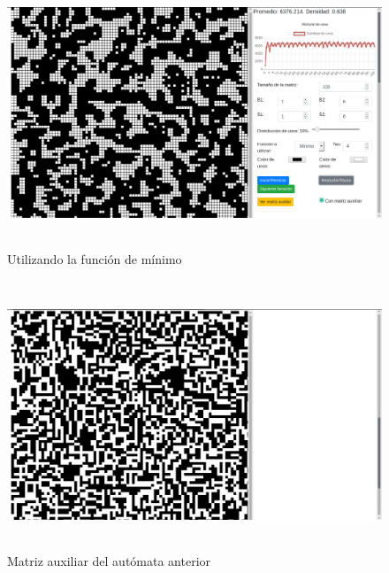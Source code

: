 \documentclass[12pt, titlepage]{article}
\begin{document}
\begin{figure}[H]
\begin{center}
 \includegraphics[width=15cm, height=8cm]{./img/1616-min.png}
 \caption{Utilizando la función de mínimo}
 \label{fig:1616-min}
\end{center}
\end{figure}

\begin{figure}[H]
\begin{center}
 \includegraphics[width=15cm, height=8cm]{./img/1616-min-aux.png}
 \caption{Matriz auxiliar del autómata anterior}
 \label{fig:1616-min-aux}
\end{center}
\end{figure}
\end{document}
